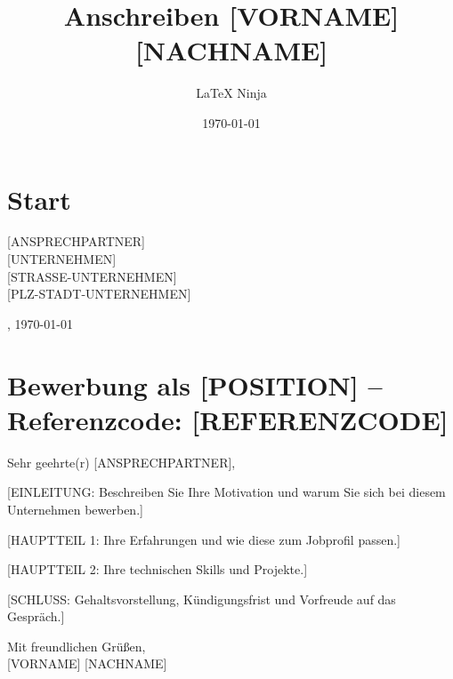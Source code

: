 \documentclass[darkhipster]{simplehipstercv}
\title{Anschreiben [VORNAME] [NACHNAME]}
\author{\LaTeX{} Ninja}
\date{\today}
\begin{document}
		\thispagestyle{empty}
		
		\section*{Start}
		
		
		\vspace{4em}
		
		[ANSPRECHPARTNER] \\
		{} [UNTERNEHMEN] \\
		{} [STRASSE-UNTERNEHMEN] \\
		{} [PLZ-STADT-UNTERNEHMEN]		
		\begin{flushright}
			, \today
		\end{flushright}
		
		\section*{Bewerbung als [POSITION] – Referenzcode: [REFERENZCODE]}
		\doublespacing
		\vspace{1em}
Sehr geehrte(r) [ANSPRECHPARTNER],

[EINLEITUNG: Beschreiben Sie Ihre Motivation und warum Sie sich bei diesem Unternehmen bewerben.]

[HAUPTTEIL 1: Ihre Erfahrungen und wie diese zum Jobprofil passen.]

[HAUPTTEIL 2: Ihre technischen Skills und Projekte.]

[SCHLUSS: Gehaltsvorstellung, Kündigungsfrist und Vorfreude auf das Gespräch.]

Mit freundlichen Grüßen, \\
{} [VORNAME] [NACHNAME]

	
	
\end{document}
